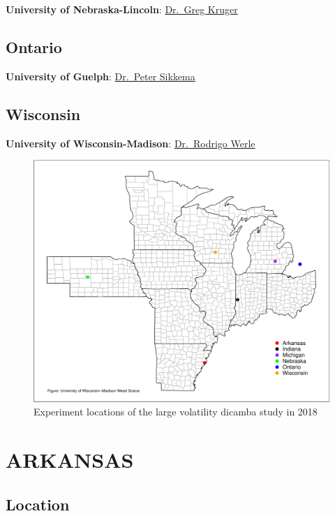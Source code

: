 \documentclass[]{article}
\begin{document}
\textbf{University of Nebraska-Lincoln}:
\href{https://agronomy.unl.edu/kruger}{Dr.~Greg Kruger}

\subsection{Ontario}\label{ontario}

\textbf{University of Guelph}:
\href{https://www.plant.uoguelph.ca/psikkema}{Dr.~Peter Sikkema}

\subsection{Wisconsin}\label{wisconsin}

\textbf{University of Wisconsin-Madison}:
\href{http://www.wiscweeds.info/}{Dr.~Rodrigo Werle}

\newpage

\begin{figure}
\centering
\includegraphics{Report_files/figure-latex/map-1.pdf}
\caption{Experiment locations of the large volatility dicamba study in
2018}
\end{figure}

\pagebreak
\newpage

\section{ARKANSAS}\label{arkansas-1}

\subsection{Location}\label{location}
\end{document}
